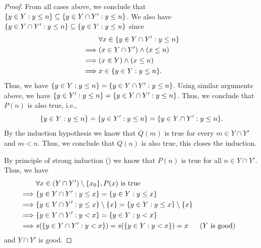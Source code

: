 \begin{proof}
  From all cases above, we conclude that \(\left\lbrace y \in Y : y \leq n\right\rbrace \subseteq \left\lbrace y \in Y \cap Y' : y \leq n\right\rbrace\).
  We also have \(\left\lbrace y \in Y \cap Y' : y \leq n\right\rbrace \subseteq \left\lbrace y \in Y : y \leq n\right\rbrace\) since
  \begin{align*}
             & \forall x \in \set{y \in Y \cap Y' : y \leq n} \\
    \implies & (x \in Y \cap Y') \land (x \leq n)             \\
    \implies & (x \in Y) \land (x \leq n)                     \\
    \implies & x \in \set{y \in Y : y \leq n}.
  \end{align*}
  Thus, we have \(\left\lbrace y \in Y : y \leq n\right\rbrace = \left\lbrace y \in Y \cap Y' : y \leq n\right\rbrace\).
  Using similar arguments above, we have \(\left\lbrace y \in Y' : y \leq n\right\rbrace = \left\lbrace y \in Y \cap Y' : y \leq n\right\rbrace\).
  Thus, we conclude that \(P(n)\) is also true, i.e.,
  \[
    \set{y \in Y : y \leq n} = \set{y \in Y' : y \leq n} = \set{y \in Y \cap Y' : y \leq n}.
  \]
  By the induction hypothesis we know that \(Q(m)\) is true for every \(m \in Y \cap Y'\) and \(m < n\).
  Thus, we conclude that \(Q(n)\) is also true, this closes the induction.

  By principle of strong induction () we know that \(P(n)\) is true for all \(n \in Y \cap Y'\).
  Thus, we have
  \begin{align*}
             & \forall x \in (Y \cap Y') \setminus \set{x_0}, P(x) \text{ is true}                                                         \\
    \implies & \set{y \in Y \cap Y' : y \leq x} = \set{y \in Y : y \leq x}                                                                 \\
    \implies & \set{y \in Y \cap Y' : y \leq x} \setminus \set{x} = \set{y \in Y : y \leq x} \setminus \set{x}                             \\
    \implies & \set{y \in Y \cap Y' : y < x} = \set{y \in Y : y < x}                                                                       \\
    \implies & s(\set{y \in Y \cap Y' : y < x}) = s(\set{y \in Y : y < x}) = x                                 &  & \text{(\(Y\) is good)}
  \end{align*}
  and \(Y \cap Y'\) is good.


\end{proof}
